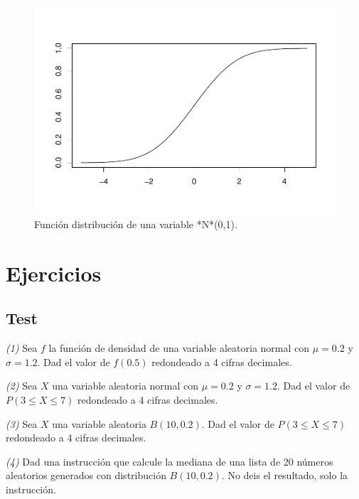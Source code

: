 \documentclass[
]{book}
\theoremstyle{definition}
\theoremstyle{definition}
\theoremstyle{definition}
\theoremstyle{remark}
\begin{document}
\begin{figure}

{\centering \includegraphics[width=0.9\linewidth]{09chap08_Distribuciones_files/figure-latex/pnorm-1} 

}

\caption{Función distribución de una variable *N*(0,1).}\label{fig:pnorm}
\end{figure}

\hypertarget{ejercicios-7}{%
\section{Ejercicios}\label{ejercicios-7}}

\hypertarget{test-6}{%
\subsection*{Test}\label{test-6}}

\emph{(1)} Sea \(f\) la función de densidad de una variable aleatoria normal con \(\mu=0.2\) y \(\sigma=1.2\). Dad el valor de \(f(0.5)\) redondeado a 4 cifras decimales.

\emph{(2)} Sea \(X\) una variable aleatoria normal con \(\mu=0.2\) y \(\sigma=1.2\). Dad el valor de \(P(3\leqslant X\leqslant 7)\) redondeado a 4 cifras decimales.

\emph{(3)} Sea \(X\) una variable aleatoria \(B(10,0.2)\). Dad el valor de \(P(3\leqslant X\leqslant 7)\) redondeado a 4 cifras decimales.

\emph{(4)} Dad una instrucción que calcule la mediana de una lista de 20 números aleatorios generados con distribución \(B(10,0.2)\). No deis el resultado, solo la instrucción.
\end{document}
